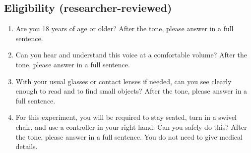 \subsection*{Eligibility (researcher-reviewed)}
\begin{enumerate}
\item Are you 18 years of age or older? After the tone, please answer in a full sentence.
\par\nopagebreak {}
\item Can you hear and understand this voice at a comfortable volume? After the tone, please answer in a full sentence.
\par\nopagebreak {}
\item With your usual glasses or contact lenses if needed, can you see clearly enough to read and to find small objects? After the tone, please answer in a full sentence.
\par\nopagebreak {}
\item For this experiment, you will be required to stay seated, turn in a swivel chair, and use a controller in your right hand. Can you safely do this? After the tone, please answer in a full sentence. You do not need to give medical details.
\par\nopagebreak {}
\end{enumerate}

